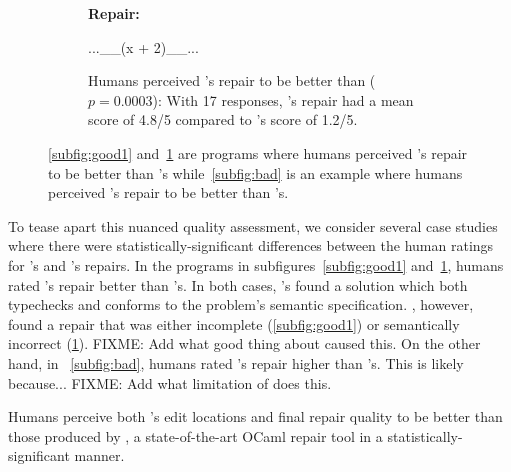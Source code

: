 \begin{figure}
\begin{subfigure}[t]{.28\textwidth}
\begin{center}
\textbf{\seminal Repair:}
\end{center}
\begin{compactcode}
      ...__(x + 2)__...
\end{compactcode}
\caption{Humans perceived \toolname's repair to be
better than \seminal ($p=0.0003$): With 17 responses, \toolname's
repair had a mean score of 4.8/5 compared to \seminal's
score of 1.2/5.}
\label{subfig:good2}
\end{subfigure}
\caption{\ref{subfig:good1} and~\ref{subfig:good2} are programs where
humans perceived \toolname's repair to be better than \seminal's while~\ref{subfig:bad}
is an example where humans perceived \seminal's repair to be better than \toolname's.}
\label{fig:examples}
\end{figure}

To tease apart this nuanced quality assessment, we consider several case studies where
there were statistically-significant differences between the human ratings for
\toolname's and \seminal's repairs. In the programs in subfigures~\ref{subfig:good1}
and~\ref{subfig:good2}, humans rated \toolname's repair better than \seminal's.
In both cases, \toolname's found a solution which both typechecks and
conforms to the problem's semantic specification. \seminal, however, found a
repair that was either incomplete (\ref{subfig:good1}) or semantically incorrect
(\ref{subfig:good2}). FIXME: Add what good thing about \toolname caused this.
On the other hand, in ~\ref{subfig:bad}, humans rated \seminal's repair higher
than \toolname's. This is likely because... FIXME: Add what limitation of \toolname
does this.
\vspace{3mm}
\begin{framed}
\noindent Humans perceive both \toolname's edit locations and final
 repair quality to be better than those produced by \seminal, a state-of-the-art
  OCaml repair tool in a statistically-significant manner.
\end{framed}




